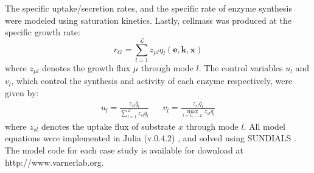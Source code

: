 \documentclass[10pt,twocolumn,twoside,final]{IEEEtran}
\begin{document}
The specific uptake/secretion rates, and the specific rate of enzyme synthesis were modeled using saturation kinetics.
Lastly, cellmass was produced at the specific growth rate:
\begin{equation}
	r_{G}  = \sum_{l = 1}^{\mathcal{L}}z_{\mu l}q_{l}\left(\mathbf{e},\mathbf{k},\mathbf{x}\right)
\end{equation}
where $z_{\mu l}$ denotes the growth flux $\mu$ through mode $l$.
The control variables $u_{l}$ and $v_{l}$, which control the synthesis and activity of each enzyme respectively, were given by:
\begin{align*}
	u_{l}  = \frac{z_{sl}\bar{q}_{l}}{\sum\limits_{l = 1}^{\mathcal{L}}z_{sl}\bar{q}_{l}} && v_{l} = \frac{z_{sl}\bar{q}_{l}}{\max\limits_{l=1,\hdots,\mathcal{L}}z_{sl}\bar{q}_{l}}
\end{align*}
where $z_{sl}$ denotes the uptake flux of substrate $x$ through mode $l$.
All model equations were implemented in Julia (v.0.4.2) \cite{Julia}, and solved using SUNDIALS \cite{Sundials}. The model code for each case study is available for download at http://www.varnerlab.org.


\end{document}
